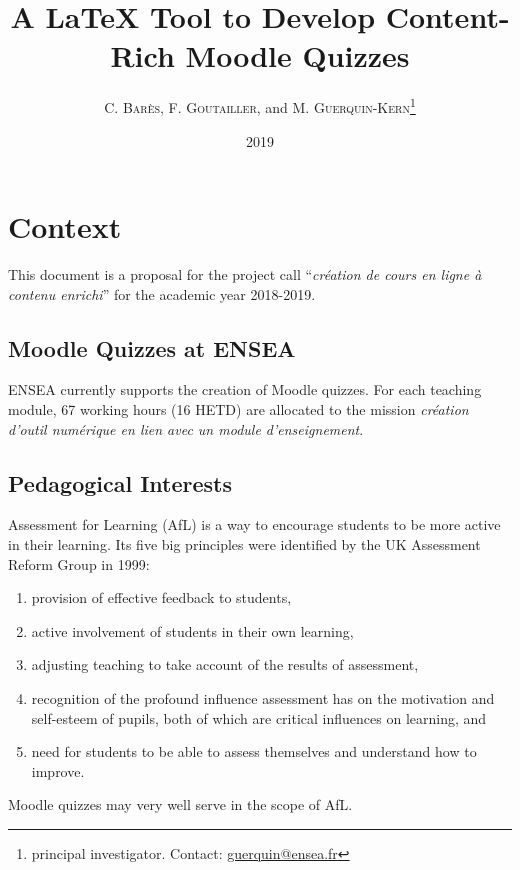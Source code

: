 \documentclass[twocolumn,a4paper,9pt]{article}
\title{A \LaTeX{} Tool to Develop Content-Rich Moodle Quizzes}
\author{C. \textsc{Barès}, F. \textsc{Goutailler}, and M. 
\textsc{Guerquin-Kern}\footnote{principal investigator. Contact: 
\href{mailto:guerquin@ensea.fr}{guerquin@ensea.fr}}}
\date{2019}
\begin{document}
\maketitle
\tableofcontents

\section{Context}

This document is a proposal for the project call ``\emph{création de cours en 
ligne à contenu enrichi}'' for the academic year 2018-2019.

\subsection{Moodle Quizzes at ENSEA}

ENSEA currently supports the creation of Moodle quizzes. For each teaching 
module, 67 working hours (16 HETD) are allocated to the mission \emph{création 
d’outil numérique en lien avec un module d’enseignement}.

\subsection{Pedagogical Interests}

Assessment for Learning (AfL) is a way to encourage students to be more active 
in their learning. Its five big principles were identified by the UK Assessment 
Reform Group in 1999:
\begin{enumerate}
	\item provision of effective feedback to students,
	\item active involvement of students in their own learning,
	\item adjusting teaching to take account of the results of assessment,
	\item recognition of the profound influence assessment has on the 
	motivation and self-esteem of pupils, both of which are critical influences 
	on learning, and
	\item need for students to be able to assess themselves and understand how 
	to improve.
\end{enumerate}

Moodle quizzes may very well serve in the scope of AfL.
\end{document}
